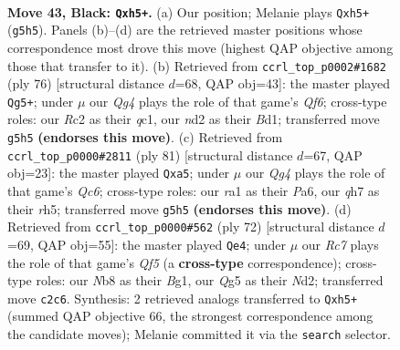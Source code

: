 \documentclass[11pt]{article}
\begin{document}
\clearpage

\begin{figure}[p]\centering
\begin{subfigure}{0.46\textwidth}\centering
\resizebox{\linewidth}{!}{%
\newchessgame
\chessboard[
  setfen={1n2nk2/7Q/7p/p4pqP/P7/7K/2rN4/RN6 b - - 10 43},
  showmover=false,
  pgfstyle=straightmove, color=movearrow, markmove={g5-h5}
]}
\caption{}
\end{subfigure}\hfill
\begin{subfigure}{0.46\textwidth}\centering
\resizebox{\linewidth}{!}{%
\newchessgame
\chessboard[
  setfen={6k1/pb3p2/4pQ2/4P3/5n2/2N5/5PP1/2qBK3 w - - 21 39},
  showmover=false,
  pgfstyle=straightmove, color=movearrow, markmove={f6-g5}
]}
\caption{}
\end{subfigure}
\\[4pt]
\begin{subfigure}{0.46\textwidth}\centering
\resizebox{\linewidth}{!}{%
\newchessgame
\chessboard[
  setfen={5k2/1p6/p7/P4N1R/7p/1Pq1N3/6P1/6K1 b - - 1 41},
  showmover=false,
  pgfstyle=straightmove, color=movearrow, markmove={c3-a5}
]}
\caption{}
\end{subfigure}\hfill
\begin{subfigure}{0.46\textwidth}\centering
\resizebox{\linewidth}{!}{%
\newchessgame
\chessboard[
  setfen={2r3k1/1q4p1/7p/pP3Q2/P4n2/3n1R2/3N3P/6BK w - - 6 37},
  showmover=false,
  pgfstyle=straightmove, color=movearrow, markmove={f5-e4}
]}
\caption{}
\end{subfigure}
\caption{\textbf{Move 43, Black: \texttt{Qxh5+}.} (a) Our position; Melanie plays \texttt{Qxh5+} (\texttt{g5h5}). Panels (b)--(d) are the retrieved master positions whose correspondence most drove this move (highest QAP objective among those that transfer to it). (b) Retrieved from \texttt{ccrl\_top\_p0002\#1682} (ply 76) [structural distance $d$=68, QAP obj=43]: the master played \texttt{Qg5+}; under $\mu$ our \emph{Qg4} plays the role of that game's \emph{Qf6}; cross-type roles: our \emph{R}c2 as their \emph{q}c1, our \emph{n}d2 as their \emph{B}d1; transferred move \texttt{g5h5} \textbf{(endorses this move)}. (c) Retrieved from \texttt{ccrl\_top\_p0000\#2811} (ply 81) [structural distance $d$=67, QAP obj=23]: the master played \texttt{Qxa5}; under $\mu$ our \emph{Qg4} plays the role of that game's \emph{Qc6}; cross-type roles: our \emph{r}a1 as their \emph{P}a6, our \emph{q}h7 as their \emph{r}h5; transferred move \texttt{g5h5} \textbf{(endorses this move)}. (d) Retrieved from \texttt{ccrl\_top\_p0000\#562} (ply 72) [structural distance $d$=69, QAP obj=55]: the master played \texttt{Qe4}; under $\mu$ our \emph{Rc7} plays the role of that game's \emph{Qf5} (a \textbf{cross-type} correspondence); cross-type roles: our \emph{N}b8 as their \emph{B}g1, our \emph{Q}g5 as their \emph{N}d2; transferred move \texttt{c2c6}. Synthesis: 2 retrieved analogs transferred to \texttt{Qxh5+} (summed QAP objective 66, the strongest correspondence among the candidate moves); Melanie committed it via the \texttt{search} selector.}
\label{fig:thought-m85}
\end{figure}
\end{document}
